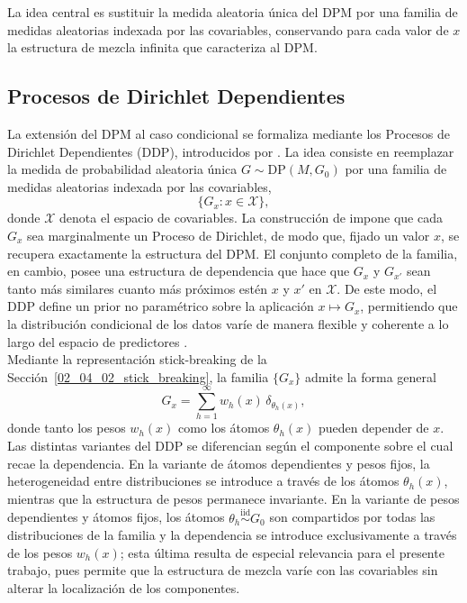 La idea central es sustituir la medida aleatoria única del DPM por una familia de medidas aleatorias indexada por las covariables, conservando para cada valor de $x$ la estructura de mezcla infinita que caracteriza al DPM.
\subsection{Procesos de Dirichlet Dependientes}
\label{02_06_01_ddp}
La extensión del DPM al caso condicional se formaliza mediante los Procesos de Dirichlet Dependientes (DDP), introducidos por \cite{02_06_maceachern1999dependent}. La idea consiste en reemplazar la medida de probabilidad aleatoria única $G \sim \mathrm{DP}(M, G_0)$ por una familia de medidas aleatorias indexada por las covariables,
\begin{equation}
    \{G_x : x \in \mathcal{X}\},
\end{equation}
donde $\mathcal{X}$ denota el espacio de covariables. La construcción de \cite{02_06_maceachern1999dependent} impone que cada $G_x$ sea marginalmente un Proceso de Dirichlet, de modo que, fijado un valor $x$, se recupera exactamente la estructura del DPM. El conjunto completo de la familia, en cambio, posee una estructura de dependencia que hace que $G_x$ y $G_{x'}$ sean tanto más similares cuanto más próximos estén $x$ y $x'$ en $\mathcal{X}$. De este modo, el DDP define un prior no paramétrico sobre la aplicación $x \mapsto G_x$, permitiendo que la distribución condicional de los datos varíe de manera flexible y coherente a lo largo del espacio de predictores \cite{02_06_maceachern1999dependent}.\\

Mediante la representación stick-breaking de la Sección~\ref{02_04_02_stick_breaking}, la familia $\{G_x\}$ admite la forma general
\begin{equation}\label{eq:ddp_general}
    G_x = \sum_{h=1}^{\infty} w_h(x)\, \delta_{\theta_h(x)},
\end{equation}
donde tanto los pesos $w_h(x)$ como los átomos $\theta_h(x)$ pueden depender de $x$.\\

Las distintas variantes del DDP se diferencian según el componente sobre el cual recae la dependencia. En la variante de átomos dependientes y pesos fijos, la heterogeneidad entre distribuciones se introduce a través de los átomos $\theta_h(x)$, mientras que la estructura de pesos permanece invariante. En la variante de pesos dependientes y átomos fijos, los átomos $\theta_h \overset{\mathrm{iid}}{\sim} G_0$ son compartidos por todas las distribuciones de la familia y la dependencia se introduce exclusivamente a través de los pesos $w_h(x)$; esta última resulta de especial relevancia para el presente trabajo, pues permite que la estructura de mezcla varíe con las covariables sin alterar la localización de los componentes.\\

